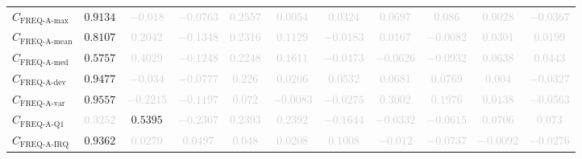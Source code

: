 \documentclass{standalone}
\newcommand{\actfreqmaxname}{\text{FREQ-A-max}}
\newcommand{\actfreqmax}{C_{\actfreqmaxname}}
\newcommand{\actfreqmeanname}{\text{FREQ-A-mean}}
\newcommand{\actfreqmean}{C_{\actfreqmeanname}}
\newcommand{\actfreqmedianname}{\text{FREQ-A-med}}
\newcommand{\actfreqmedian}{C_{\actfreqmedianname}}
\newcommand{\actfreqdevname}{\text{FREQ-A-dev}}
\newcommand{\actfreqdev}{C_{\actfreqdevname}}
\newcommand{\actfreqvarname}{\text{FREQ-A-var}}
\newcommand{\actfreqvar}{C_{\actfreqvarname}}
\newcommand{\actfreqqonename}{\text{FREQ-A-Q1}}
\newcommand{\actfreqqone}{C_{\actfreqqonename}}
\newcommand{\actfreqiqrname}{\text{FREQ-A-IRQ}}
\newcommand{\actfreqiqr}{C_{\actfreqiqrname}}
\begin{document}
\begin{tabular}{lcccccccccc}
$\actfreqmax$ & $0.9134$ & \textcolor{lightgray}{$-0.018$} & \textcolor{lightgray}{$-0.0763$} & \textcolor{lightgray}{$0.2557$} & \textcolor{lightgray}{$0.0054$} & \textcolor{lightgray}{$0.0324$} & \textcolor{lightgray}{$0.0697$} & \textcolor{lightgray}{$0.086$} & \textcolor{lightgray}{$0.0028$} & \textcolor{lightgray}{$-0.0367$} \\ 
$\actfreqmean$ & $0.8107$ & \textcolor{lightgray}{$0.2042$} & \textcolor{lightgray}{$-0.1348$} & \textcolor{lightgray}{$0.2316$} & \textcolor{lightgray}{$0.1129$} & \textcolor{lightgray}{$-0.0183$} & \textcolor{lightgray}{$0.0167$} & \textcolor{lightgray}{$-0.0082$} & \textcolor{lightgray}{$0.0301$} & \textcolor{lightgray}{$0.0199$} \\ 
$\actfreqmedian$ & $0.5757$ & \textcolor{lightgray}{$0.4029$} & \textcolor{lightgray}{$-0.1248$} & \textcolor{lightgray}{$0.2248$} & \textcolor{lightgray}{$0.1611$} & \textcolor{lightgray}{$-0.0473$} & \textcolor{lightgray}{$-0.0626$} & \textcolor{lightgray}{$-0.0932$} & \textcolor{lightgray}{$0.0638$} & \textcolor{lightgray}{$0.0443$} \\ 
$\actfreqdev$ & $0.9477$ & \textcolor{lightgray}{$-0.034$} & \textcolor{lightgray}{$-0.0777$} & \textcolor{lightgray}{$0.226$} & \textcolor{lightgray}{$0.0206$} & \textcolor{lightgray}{$0.0532$} & \textcolor{lightgray}{$0.0681$} & \textcolor{lightgray}{$0.0769$} & \textcolor{lightgray}{$0.004$} & \textcolor{lightgray}{$-0.0327$} \\ 
$\actfreqvar$ & $0.9557$ & \textcolor{lightgray}{$-0.2215$} & \textcolor{lightgray}{$-0.1197$} & \textcolor{lightgray}{$0.072$} & \textcolor{lightgray}{$-0.0083$} & \textcolor{lightgray}{$-0.0275$} & \textcolor{lightgray}{$0.3002$} & \textcolor{lightgray}{$0.1976$} & \textcolor{lightgray}{$0.0138$} & \textcolor{lightgray}{$-0.0563$} \\ 
$\actfreqqone$ & \textcolor{lightgray}{$0.3252$} & $0.5395$ & \textcolor{lightgray}{$-0.2367$} & \textcolor{lightgray}{$0.2393$} & \textcolor{lightgray}{$0.2392$} & \textcolor{lightgray}{$-0.1644$} & \textcolor{lightgray}{$-0.0332$} & \textcolor{lightgray}{$-0.0615$} & \textcolor{lightgray}{$0.0706$} & \textcolor{lightgray}{$0.073$} \\ 
$\actfreqiqr$ & $0.9362$ & \textcolor{lightgray}{$0.0279$} & \textcolor{lightgray}{$0.0497$} & \textcolor{lightgray}{$0.048$} & \textcolor{lightgray}{$0.0208$} & \textcolor{lightgray}{$0.1008$} & \textcolor{lightgray}{$-0.012$} & \textcolor{lightgray}{$-0.0737$} & \textcolor{lightgray}{$-0.0092$} & \textcolor{lightgray}{$-0.0276$} \\ 

\end{tabular}
\end{document}

